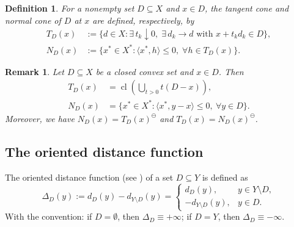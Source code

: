 \documentclass[11pt]{article}
\DeclareMathOperator{\cl}{cl}
\newtheorem{definition}{Definition}[section]
\newtheorem{remark}{Remark}[section]
\begin{document}
 
\begin{definition}  
 For a nonempty set $D \subseteq X$ and $x \in D$, the \emph{tangent cone} and \emph{normal cone} of  $D$ at  $x$ are defined, respectively, by  
 \begin{align*}
 	T_D(x) &:= \bigl\{ d \in X : \exists\, t_k \downarrow 0,\; \exists\, d_k \to d \text{ with } x + t_k d_k \in D \bigr\},\\
 	N_D(x) &:= \{x^* \in X^* : \langle x^*, h \rangle \leq 0, \; \forall h \in T_D(x)\}.
 \end{align*}
  \end{definition}

 

\begin{remark} \label{RtDFxl}    \cite{Zalinescu2002, AE1984}    Let  $D \subseteq X$ be a closed convex set  and $x \in D$.  Then
	\begin{align*}
		T_D(x) &= \cl \left( \bigcup_{t > 0} t(D - x) \right),\\
		N_D(x) &= \{ x^* \in X^* : \langle x^*, y - x \rangle \le 0,\ \forall y \in D \}.  
	\end{align*}
	Moreover, we have  $N_D(x) = T_D(x)^\ominus$ and $T_D(x) = N_D(x)^\ominus$.
\end{remark}


 

\subsection{The  oriented distance function}

The oriented distance function (see \cite{Hiriart1,Hiriart2}) of a set $D \subseteq Y$ is defined as
$$
\Delta_D(y) := d_D(y) - d_{Y \setminus D}(y) = \begin{cases}
	d_D(y), & y \in Y \setminus D, \\
	-d_{Y \setminus D}(y), & y \in D.
\end{cases}
$$
With the convention: if $D = \emptyset$, then $\Delta_D \equiv +\infty$; if $D = Y$, then $\Delta_D \equiv -\infty$.
\end{document}

